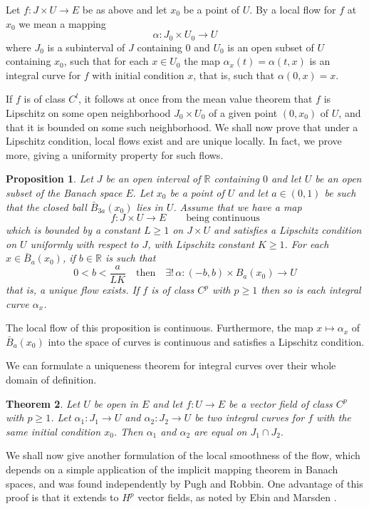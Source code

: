 \documentclass[a5paper,10pt,twoside]{article}
\newcommand{\R}{\ensuremath{\mathbb{R}}}
\theoremstyle{plain}
\newtheorem{teo}{Theorem}[section]
\newtheorem{prop}[teo]{Proposition}
\theoremstyle{definition}
\theoremstyle{remark}
\begin{document}
Let $f:J\times U\to E$ be as above and let $x_0$ be a point of $U$. By a local flow for $f$ at $x_0$ we mean a mapping
$$
\alpha:J_0\times U_0\to U
$$
where $J_0$ is  a subinterval of $J$ containing $0$ and $U_0$ is an open subset of $U$ containing $x_0$, such that for each $x\in U_0$ the map $\alpha_x(t)=\alpha(t,x)$ is an integral curve for $f$ with initial condition $x$, that is, such that $\alpha(0,x)=x.$

If $f$ is of class $C^l$, it follows at once from the mean value theorem that $f$ is Lipschitz on some open neighborhood $J_0\times U_0$ of a given point $(0, x_0)$ of $U$, and that it is bounded on some such neighborhood. We shall now prove that under a Lipschitz condition, local flows exist and are unique locally. In fact, we prove more, giving a uniformity property for such flows.

\begin{prop}
Let $J$ be an open interval of $\R$ containing $0$ and let $U$ be an open subset of the Banach space $E.$ Let $x_0$ be  a point of $U$ and let $a\in(0,1)$ be such that the closed ball $\bar{B}_{3a}(x_0)$ lies in $U$. Assume that we have a map 
$$
f: J\times U\to E \qquad \text{being continuous}
$$
which is bounded by a constant $L\geq 1$ on $J\times U$ and satisfies a Lipschitz condition on $U$ uniformly with respect to $J$, with Lipschitz constant $K\geq 1$. For each $x\in\bar{B}_a(x_0)$, if $b\in \R$ is such that 
$$
0<b<\frac{a}{LK} \quad\mathrm{then}\quad \exists!\, \alpha :(-b,b)\times B_a(x_0)\to U
$$
that is, a unique flow exists. If $f$ is of class $C^p$ with $p\geq 1$ then so is each integral curve $\alpha_x$.
\end{prop}

The local flow of this proposition is continuous. Furthermore, the map $x\mapsto \alpha_x$ of $\bar{B}_a(x_0)$ into the space of curves is continuous and satisfies a Lipschitz condition.

We can formulate a uniqueness theorem for integral curves over their whole domain of definition.

\begin{teo}
Let $U$ be open in $E$ and let $f:U\to E$ be a vector field of class $C^p$ with $p\geq 1$. Let $\alpha_1:J_1\to U$ and $\alpha_2:J_2\to U$ be two integral curves for $f$ with the same initial condition $x_0$. Then $\alpha_1$ and $\alpha_2$ are equal on $J_1\cap J_2.$
\end{teo}

We shall now give another formulation of the local smoothness of the flow, which depends on a simple application of the implicit mapping theorem in Banach spaces, and was found independently by Pugh and Robbin. One advantage of this proof is that it extends to $H^p$ vector fields, as noted by Ebin and Marsden \cite{ebin1970groups}.
\end{document}
